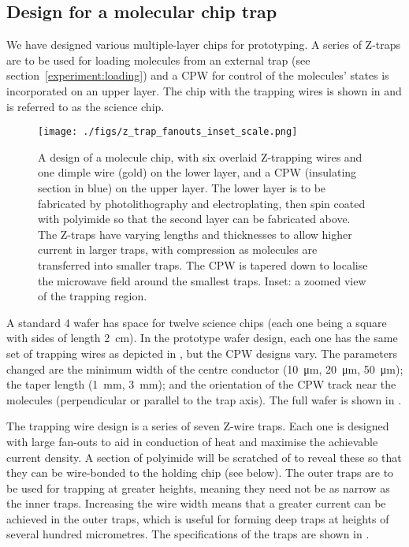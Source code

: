 \subsection{Design for a molecular chip trap}

We have designed various multiple-layer chips for prototyping. A series of
Z-traps are to be used for loading molecules from an external trap (see
section~\ref{experiment:loading}) and a CPW for control of the molecules' states
is incorporated on an upper layer. The chip with the trapping wires is shown in
 and is referred to as the science chip.

\begin{figure}[tph]
  \texttt{[image: ./figs/z\_trap\_fanouts\_inset\_scale.png]}
  \caption{
    A design of a molecule chip, with six overlaid Z-trapping wires and one
    dimple wire (gold) on the lower layer, and a CPW (insulating section in
    blue) on the upper layer.  The lower layer is to be fabricated by
    photolithography and electroplating, then spin coated with polyimide so that
    the second layer can be fabricated above. The Z-traps have varying lengths
    and thicknesses to allow higher current in larger traps, with compression as
    molecules are transferred into smaller traps. The CPW is tapered down to
    localise the microwave field around the smallest traps. Inset: a zoomed view
    of the trapping region.
  }
  \label{experiment:fig:chipdesign}
\end{figure}

A standard \SI{4}{\inch} wafer has space for twelve science chips (each one being
a square with sides of length \SI{2}{\centi\metre}). In the prototype wafer
design, each one has the same set of trapping wires as depicted in
, but the CPW designs vary. The parameters
changed are the minimum width of the centre conductor (\SI{10}{\micro\metre},
\SI{20}{\micro\metre}, \SI{50}{\micro\metre}); the taper length
(\SI{1}{\milli\metre}, \SI{3}{\milli\metre}); and the orientation of the CPW
track near the molecules (perpendicular or parallel to the trap axis). The full
wafer is shown in .

The trapping wire design is a series of seven Z-wire traps. Each one is designed
with large fan-outs to aid in conduction of heat and maximise the achievable
current density. A section of polyimide will be scratched of to reveal these so
that they can be wire-bonded to the holding chip (see below). The outer traps
are to be used for trapping at greater heights, meaning they need not be as
narrow as the inner traps. Increasing the wire width means that a greater
current can be achieved in the outer traps, which is useful for forming deep
traps at heights of several hundred micrometres. The specifications of the traps
are shown in .

